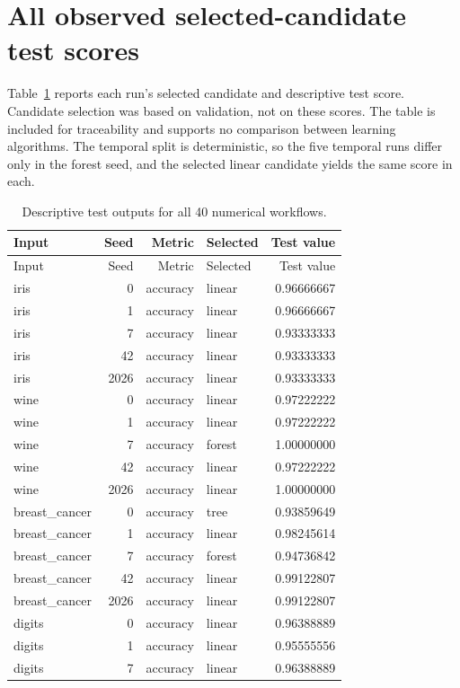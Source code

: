 \documentclass[11pt,letterpaper]{article}
\begin{document}
\section{All observed selected-candidate test scores}
Table~\ref{tab:scores} reports each run's selected candidate and descriptive test score. Candidate selection was based on validation, not on these scores. The table is included for traceability and supports no comparison between learning algorithms. The temporal split is deterministic, so the five temporal runs differ only in the forest seed, and the selected linear candidate yields the same score in each.

\begin{longtable}{lrrlr}
\caption{Descriptive test outputs for all 40 numerical workflows.}\label{tab:scores}\\
\toprule Input & Seed & Metric & Selected & Test value\\\midrule\endfirsthead
\toprule Input & Seed & Metric & Selected & Test value\\\midrule\endhead
iris & 0 & accuracy & linear & 0.96666667\\
iris & 1 & accuracy & linear & 0.96666667\\
iris & 7 & accuracy & linear & 0.93333333\\
iris & 42 & accuracy & linear & 0.93333333\\
iris & 2026 & accuracy & linear & 0.93333333\\
wine & 0 & accuracy & linear & 0.97222222\\
wine & 1 & accuracy & linear & 0.97222222\\
wine & 7 & accuracy & forest & 1.00000000\\
wine & 42 & accuracy & linear & 0.97222222\\
wine & 2026 & accuracy & linear & 1.00000000\\
breast\_cancer & 0 & accuracy & tree & 0.93859649\\
breast\_cancer & 1 & accuracy & linear & 0.98245614\\
breast\_cancer & 7 & accuracy & forest & 0.94736842\\
breast\_cancer & 42 & accuracy & linear & 0.99122807\\
breast\_cancer & 2026 & accuracy & linear & 0.99122807\\
digits & 0 & accuracy & linear & 0.96388889\\
digits & 1 & accuracy & linear & 0.95555556\\
digits & 7 & accuracy & linear & 0.96388889\\

\end{longtable}
\end{document}
